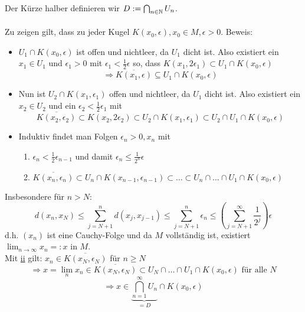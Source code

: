 \begin{beweis}
    Der Kürze halber definieren wir $D := \bigcap_{n \in \mathbb{N}} U_{n}$. \\ \\
    Zu zeigen gilt, dass zu jeder Kugel $K(x_{0}, \epsilon), x_{0} \in M, \epsilon > 0$.
	Beweis: 
	\begin{itemize}
		\item $U_{1} \cap K(x_{0}, \epsilon)$ ist offen und nichtleer, da $U_{1}$ dicht ist. Also existiert ein $x_{1} \in U_{1}$ und $\epsilon_{1} > 0$ mit $\epsilon_{1} < \frac{1}{2} \epsilon$ so, dass $K( x_{1}, 2 \epsilon_{1}) \subset U_{1} \cap K(x_{0}, \epsilon)$
			\[ \Rightarrow \overline{K(x_{1}, \epsilon)} \subseteq U_{1} \cap K(x_{0}, \epsilon) \]
		\item Nun ist $U_{2} \cap K(x_{1}, \epsilon_{1})$  offen und nichtleer, da $U_{1}$ dicht ist. Also existiert ein $x_{2} \in U_{2}$ und ein $\epsilon_{2} < \frac{1}{2} \epsilon_{1}$ mit
			\[ \overline{K(x_{2}, \epsilon_{2})} \subset K(x_{2}, 2 \epsilon_{2}) \subset U_{2} \cap K(x_{1}, \epsilon_{1}) \subset U_{2} \cap U_{1} \cap K(x_{0}, \epsilon) \]
		\item Induktiv findet man Folgen $\epsilon_{n} > 0, x_{n}$ mit
			\begin{enumerate}[label=(\roman*\upshape)]
				\item $\epsilon_{n} < \frac{1}{2} \epsilon_{n - 1}$ und damit $\epsilon_{n} \leq \frac{1}{2^{n}} \epsilon$
				\label{satz:9.1-proof-ii}
				\item $\overline{K(x_{n}, \epsilon_{n})} \subset U_{n} \cap K(x_{n - 1}, \epsilon_{n - 1}) \subset \dotsc \subset U_{n} \cap \dotsc \cap U_{1} \cap K(x_{0}, \epsilon)$
			\end{enumerate}
	\end{itemize}
	Insbesondere für $n > N$:
	\[ d(x_{n}, x_{N}) \leq \sum_{j = N + 1}^{n} d(x_{j}, x_{j - 1}) \leq \sum_{j = N + 1}^{n} \epsilon_{n} \leq \left( \sum_{j = N + 1}^{\infty} \frac{1}{2^{j}} \right) \epsilon \]
	d.h. $(x_{n})$ ist eine Cauchy-Folge und da $M$ vollständig ist, existiert $\lim_{n \rightarrow \infty} x_{n} =: x$ in $M$. \\
	Mit \hyperref[satz:9.1-proof-ii]{ii} gilt: $x_{n} \in \overline{K(x_{N}, \epsilon_{N})}$ für $n \geq N$
	\[ \Rightarrow x = \lim_{n} x_{n} \in \overline{K(x_{N}, \epsilon_{N})} \subset U_{N} \cap \dotsc \cap U_{1} \cap K(x_{0}, \epsilon) \text{ für alle } N \]
	\[ \Rightarrow x \in \underbrace{\bigcap_{n = 1}^{\infty} U_{n}}_{= D} \cap K(x_{0}, \epsilon) \]
\end{beweis}


